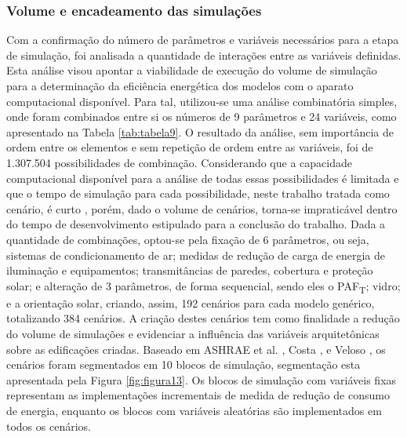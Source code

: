 \subsubsection{Volume e encadeamento das simulações}
\noindent Com a confirmação do número de parâmetros e variáveis necessários para a etapa de simulação, foi analisada a quantidade de interações entre as variáveis definidas. Esta análise visou apontar a viabilidade de execução do volume de simulação para a determinação da eficiência energética dos modelos com o aparato computacional disponível.\vspace*{0.3cm} \newline
\noindent Para tal, utilizou-se uma análise combinatória simples, onde foram combinados entre si os números de 9 parâmetros e 24 variáveis, como apresentado na Tabela \ref{tab:tabela9}. O resultado da análise, sem importância de ordem entre os elementos e sem repetição de ordem entre as variáveis, foi de 1.307.504 possibilidades de combinação. Considerando que a capacidade computacional disponível para a análise de todas essas possibilidades é limitada e que o tempo de simulação para cada possibilidade, neste trabalho tratada como cenário, é curto \cite{Werneck2017}, porém, dado o volume de cenários, torna-se impraticável dentro do tempo de desenvolvimento estipulado para a conclusão do trabalho.\vspace*{0.3cm} \newline
\noindent Dada a quantidade de combinações, optou-se pela fixação de 6 parâmetros, ou seja, sistemas de condicionamento de ar; medidas de redução de carga de energia de iluminação e equipamentos; transmitâncias de paredes, cobertura e proteção solar; e alteração de 3 parâmetros, de forma sequencial, sendo eles o PAF\textsubscript{T}; vidro; e a orientação solar, criando, assim, 192 cenários para cada modelo genérico, totalizando 384 cenários.\vspace*{0.3cm} \newline
\noindent A criação destes cenários tem como finalidade a redução do volume de simulações e evidenciar a influência das variáveis arquitetônicas sobre as edificações criadas. Baseado em ASHRAE et al. \citeyear{AmericanSocietyofHeatingRefrigeratingandAir-ConditioningEngineers-ASHRAE2019}, Costa \citeyear{Costa2018}, e Veloso \citeyear{Veloso2017}, os cenários foram segmentados em 10 blocos de simulação, segmentação esta apresentada pela Figura \ref{fig:figura13}. Os blocos de simulação com variáveis fixas representam as implementações incrementais de medida de redução de consumo de energia, enquanto os blocos com variáveis aleatórias são implementados em todos os cenários.\pagebreak
